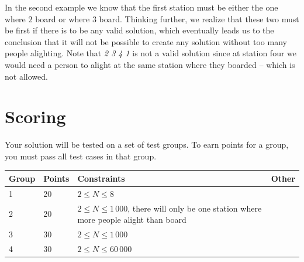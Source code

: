 In the second example we know that the first station must be either the one where $2$ board or where $3$
board. Thinking further, we realize that these two must be first if there is to be any valid solution,
which eventually leads us to the conclusion that it will not be possible to create any solution without too many
people alighting. Note that \emph{2 3 4 1} is not a valid solution since at station four we would need a person
to alight at the same station where they boarded -- which is not allowed.

\section*{Scoring}
Your solution will be tested on a set of test groups. To earn points for a group, you must pass all test cases in that group.

\begin{tabular}{| l | l | l | l |}
\hline
Group & Points & Constraints & Other\\ \hline
1     & 20         & $ 2 \le N \le 8 $ & \\ \hline
2     & 20         & $ 2 \le N \le 1\,000 $, there will only be one station where more people alight than board & \\ \hline
3     & 30         & $ 2 \le N \le 1\,000 $ & \\ \hline
4     & 30         & $ 2 \le N \le 60\,000 $ & \\ \hline
\end{tabular}
